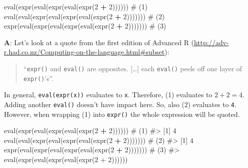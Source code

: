 \documentclass[
]{krantz}
\makeatletter
\newenvironment{Shaded}{\begin{snugshade}}{\end{snugshade}}
\newcommand{\CommentTok}[1]{\textcolor[rgb]{0.56,0.35,0.01}{\textit{#1}}}
\newcommand{\DecValTok}[1]{\textcolor[rgb]{0.00,0.00,0.81}{#1}}
\newcommand{\KeywordTok}[1]{\textcolor[rgb]{0.13,0.29,0.53}{\textbf{#1}}}
\newcommand{\NormalTok}[1]{#1}
\newcommand{\OperatorTok}[1]{\textcolor[rgb]{0.81,0.36,0.00}{\textbf{#1}}}
\newcommand{\StringTok}[1]{\textcolor[rgb]{0.31,0.60,0.02}{#1}}
\renewcommand{\href}[2]{#2 (\url{#1})}
\newenvironment{kframe}{%
\medskip{}
\setlength{\fboxsep}{.8em}
 \def\at@end@of@kframe{}%
 \ifinner\ifhmode%
  \def\at@end@of@kframe{\end{minipage}}%
  \begin{minipage}{\columnwidth}%
 \fi\fi%
 \def\FrameCommand##1{\hskip\@totalleftmargin \hskip-\fboxsep
 \colorbox{shadecolor}{##1}\hskip-\fboxsep
     \hskip-\linewidth \hskip-\@totalleftmargin \hskip\columnwidth}%
 \MakeFramed {\advance\hsize-\width
   \@totalleftmargin\z@ \linewidth\hsize
   \@setminipage}}%
 {\par\unskip\endMakeFramed%
 \at@end@of@kframe}
\renewenvironment{Shaded}{\begin{kframe}}{\end{kframe}}
\renewcommand{\KeywordTok} [1]{\textcolor[rgb]{0.00,0.44,0.13}{{#1}}}
\renewcommand{\DecValTok}  [1]{\textcolor[rgb]{0.25,0.63,0.44}{{#1}}}
\renewcommand{\StringTok}  [1]{\textcolor[rgb]{0.25,0.44,0.63}{{#1}}}
\renewcommand{\CommentTok} [1]{\textcolor[rgb]{0.38,0.63,0.69}{{#1}}}
\renewcommand{\NormalTok}  [1]{{#1}}
\makeatother
\begin{document}
\begin{Shaded}
\begin{Highlighting}[]
\KeywordTok{eval}\NormalTok{(}\KeywordTok{expr}\NormalTok{(}\KeywordTok{eval}\NormalTok{(}\KeywordTok{expr}\NormalTok{(}\KeywordTok{eval}\NormalTok{(}\KeywordTok{expr}\NormalTok{(}\DecValTok{2} \OperatorTok{+}\StringTok{ }\DecValTok{2}\NormalTok{))))))        }\CommentTok{# (1)}
\KeywordTok{eval}\NormalTok{(}\KeywordTok{eval}\NormalTok{(}\KeywordTok{expr}\NormalTok{(}\KeywordTok{eval}\NormalTok{(}\KeywordTok{expr}\NormalTok{(}\KeywordTok{eval}\NormalTok{(}\KeywordTok{expr}\NormalTok{(}\DecValTok{2} \OperatorTok{+}\StringTok{ }\DecValTok{2}\NormalTok{)))))))  }\CommentTok{# (2)}
\KeywordTok{expr}\NormalTok{(}\KeywordTok{eval}\NormalTok{(}\KeywordTok{expr}\NormalTok{(}\KeywordTok{eval}\NormalTok{(}\KeywordTok{expr}\NormalTok{(}\KeywordTok{eval}\NormalTok{(}\KeywordTok{expr}\NormalTok{(}\DecValTok{2} \OperatorTok{+}\StringTok{ }\DecValTok{2}\NormalTok{)))))))  }\CommentTok{# (3)}
\end{Highlighting}
\end{Shaded}

\textbf{{A}}: Let's look at a quote from the \href{http://adv-r.had.co.nz/Computing-on-the-language.html\#subset}{first edition of Advanced R}:

\begin{quote}
``\texttt{expr()} and \texttt{eval()} are opposites. {[}\ldots{]} each \texttt{eval()} peels off one layer of \texttt{expr()}'s''.
\end{quote}

In general, \texttt{eval(expr(x))} evaluates to \texttt{x}. Therefore, (1) evaluates to \(2 + 2 = 4\). Adding another \texttt{eval()} doesn't have impact here. So, also (2) evaluates to \texttt{4}. However, when wrapping (1) into \texttt{expr()} the whole expression will be quoted.

\begin{Shaded}
\begin{Highlighting}[]
\KeywordTok{eval}\NormalTok{(}\KeywordTok{expr}\NormalTok{(}\KeywordTok{eval}\NormalTok{(}\KeywordTok{expr}\NormalTok{(}\KeywordTok{eval}\NormalTok{(}\KeywordTok{expr}\NormalTok{(}\DecValTok{2} \OperatorTok{+}\StringTok{ }\DecValTok{2}\NormalTok{))))))        }\CommentTok{# (1)}
\CommentTok{#> [1] 4}
\KeywordTok{eval}\NormalTok{(}\KeywordTok{eval}\NormalTok{(}\KeywordTok{expr}\NormalTok{(}\KeywordTok{eval}\NormalTok{(}\KeywordTok{expr}\NormalTok{(}\KeywordTok{eval}\NormalTok{(}\KeywordTok{expr}\NormalTok{(}\DecValTok{2} \OperatorTok{+}\StringTok{ }\DecValTok{2}\NormalTok{)))))))  }\CommentTok{# (2)}
\CommentTok{#> [1] 4}
\KeywordTok{expr}\NormalTok{(}\KeywordTok{eval}\NormalTok{(}\KeywordTok{expr}\NormalTok{(}\KeywordTok{eval}\NormalTok{(}\KeywordTok{expr}\NormalTok{(}\KeywordTok{eval}\NormalTok{(}\KeywordTok{expr}\NormalTok{(}\DecValTok{2} \OperatorTok{+}\StringTok{ }\DecValTok{2}\NormalTok{)))))))  }\CommentTok{# (3)}
\CommentTok{#> eval(expr(eval(expr(eval(expr(2 + 2))))))}
\end{Highlighting}
\end{Shaded}
\end{document}
